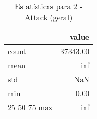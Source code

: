 \begin{table}[htbp]
\caption{Estatísticas para 2 - Attack (geral)}
\label{tab:2_-_attack_(geral)_summary}
\begin{tabular}{lr}
\toprule
 & value \\
\midrule
count & 37343.00 \\
mean & inf \\
std & NaN \\
min & 0.00 \\
25%
50%
75%
max & inf \\
\bottomrule
\end{tabular}
\end{table}
